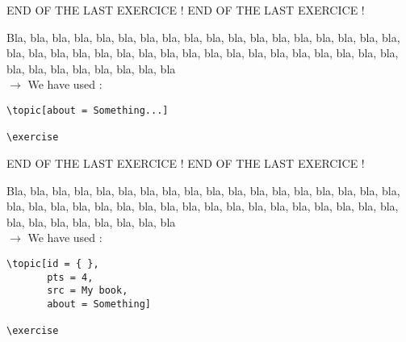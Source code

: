 \documentclass[12pt]{article}
\newcommand\blabla{%
		\noindent Bla, bla, bla, bla, bla, bla, bla, bla, bla, bla, bla,
		bla, bla, bla, bla, bla, bla, bla, bla, bla, bla, bla,
		bla, bla, bla, bla, bla, bla, bla, bla, bla, bla, bla,
		bla, bla, bla, bla, bla, bla, bla, bla, bla, bla, bla
	}
\newcommand\codeused{
		\blabla{} \medskip  \\ \noindent $\rightarrow$ We have used :
	}
\begin{document}
\newpage \medskip \noindent END OF THE LAST EXERCICE ! END OF THE LAST EXERCICE !

\topic[about = Something...]

\exercise

\codeused{}
\begin{verbatim}
\topic[about = Something...]

\exercise
\end{verbatim}



\newpage \medskip \noindent END OF THE LAST EXERCICE ! END OF THE LAST EXERCICE !

\topic[id = { }, pts = 4, src = My book, about = Something]

\exercise

\codeused{}
\begin{verbatim}
\topic[id = { }, 
       pts = 4, 
       src = My book, 
       about = Something]

\exercise
\end{verbatim}
\end{document}
